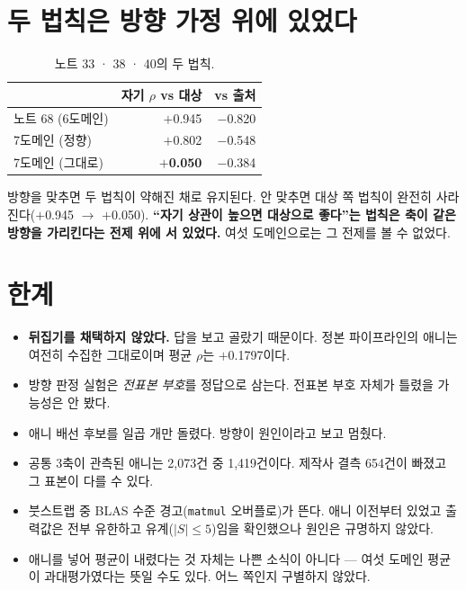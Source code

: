 \documentclass[10pt]{article}
\begin{document}
\section{두 법칙은 방향 가정 위에 있었다}

\begin{table}[t]
\centering\tsize
\caption{노트 33 · 38 · 40의 두 법칙.}
\begin{tabular}{lrr}
\toprule
& 자기 $\rho$ vs 대상 & vs 출처 \\
\midrule
노트 68 (6도메인) & $+$0.945 & $-$0.820 \\
7도메인 (정향) & $+$0.802 & $-$0.548 \\
7도메인 (그대로) & \textbf{$+$0.050} & $-$0.384 \\
\bottomrule
\end{tabular}
\end{table}

방향을 맞추면 두 법칙이 약해진 채로 유지된다. 안 맞추면 대상 쪽 법칙이 완전히
사라진다($+$0.945 $\to$ $+$0.050). \textbf{``자기 상관이 높으면 대상으로 좋다''는
법칙은 축이 같은 방향을 가리킨다는 전제 위에 서 있었다.} 여섯 도메인으로는
그 전제를 볼 수 없었다.

\section{한계}

\begin{itemize}[leftmargin=1.1em,itemsep=0.15em]
\item \textbf{뒤집기를 채택하지 않았다.} 답을 보고 골랐기 때문이다. 정본
      파이프라인의 애니는 여전히 수집한 그대로이며 평균 $\rho$는 $+$0.1797이다.
\item 방향 판정 실험은 \emph{전표본 부호}를 정답으로 삼는다. 전표본 부호 자체가
      틀렸을 가능성은 안 봤다.
\item 애니 배선 후보를 일곱 개만 돌렸다. 방향이 원인이라고 보고 멈췄다.
\item 공통 3축이 관측된 애니는 2,073건 중 1,419건이다. 제작사 결측 654건이
      빠졌고 그 표본이 다를 수 있다.
\item 붓스트랩 중 BLAS 수준 경고(\texttt{matmul} 오버플로)가 뜬다. 애니 이전부터
      있었고 출력값은 전부 유한하고 유계($|S|\le5$)임을 확인했으나 원인은
      규명하지 않았다.
\item 애니를 넣어 평균이 내렸다는 것 자체는 나쁜 소식이 아니다 --- 여섯 도메인
      평균이 과대평가였다는 뜻일 수도 있다. 어느 쪽인지 구별하지 않았다.
\end{itemize}
\end{document}
